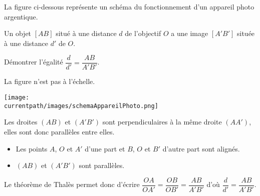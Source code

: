 \begin{exercice*}
    La figure ci-dessous représente un schéma du fonctionnement d'un appareil photo argentique.

    Un objet $[AB]$ situé à une distance $d$ de l'objectif $O$ a une image $[A'B']$ située à une distance $d'$ de $O$.

    \medskip
    Démontrer l'égalité $\dfrac{d}{d'}=\dfrac{AB}{A'B'}$.

    \begin{minipage}{1\linewidth}
    \begin{center}
        La figure n'est pas à l'échelle.

        \texttt{[image: \\currentpath/images/schemaAppareilPhoto.png]}    
    \end{center}
    \end{minipage}    
\end{exercice*}
\begin{corrige}
    Les droites $(AB)$ et $(A'B')$ sont perpendiculaires à la même droite $(AA')$, elles sont donc parallèles entre elles.

    \begin{itemize}
        \item Les points $A$, $O$ et $A'$ d'une part et $B$, $O$ et $B'$ d'autre part sont alignés.
        \item $(AB)$ et $(A'B')$ sont parallèles.
    \end{itemize}

    Le théorème de Thalès permet donc d'écrire $\dfrac{OA}{OA'}=\dfrac{OB}{OB'}=\dfrac{AB}{A'B'}$ d'où $\dfrac{d}{d'}=\dfrac{AB}{A'B'}$.
\end{corrige}

